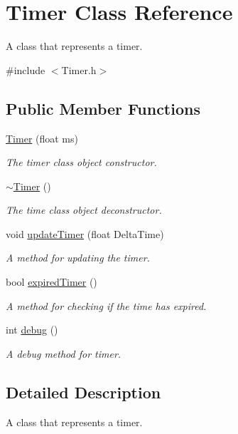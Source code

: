 \hypertarget{class_timer}{\section{Timer Class Reference}
\label{class_timer}
}


A class that represents a timer.  




{\ttfamily \#include $<$Timer.\+h$>$}

\subsection*{Public Member Functions}
\begin{DoxyCompactItemize}
\item 
\hyperlink{class_timer_a2cf265defc892796c92dc09d8a482ced}{Timer} (float ms)
\begin{DoxyCompactList}\small\item\em The timer class object constructor. \end{DoxyCompactList}\item 
\hyperlink{class_timer_a14fa469c4c295c5fa6e66a4ad1092146}{$\sim$\+Timer} ()
\begin{DoxyCompactList}\small\item\em The time class object deconstructor. \end{DoxyCompactList}\item 
void \hyperlink{class_timer_a796907a264f364f5a4c819e7c18b1302}{update\+Timer} (float Delta\+Time)
\begin{DoxyCompactList}\small\item\em A method for updating the timer. \end{DoxyCompactList}\item 
bool \hyperlink{class_timer_a3ddc2b42f18cae583dc1a730fbd29fac}{expired\+Timer} ()
\begin{DoxyCompactList}\small\item\em A method for checking if the time has expired. \end{DoxyCompactList}\item 
int \hyperlink{class_timer_a32b0f17af4c43fc9a6f9730c718d1f9d}{debug} ()
\begin{DoxyCompactList}\small\item\em A debug method for timer. \end{DoxyCompactList}\end{DoxyCompactItemize}


\subsection{Detailed Description}
A class that represents a timer. 


